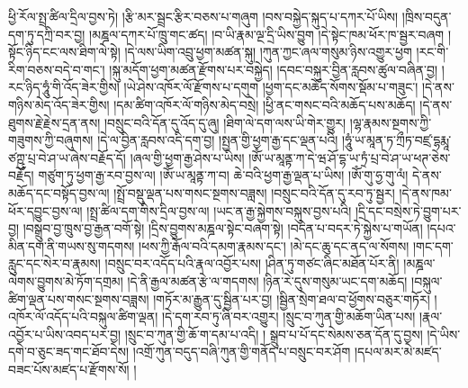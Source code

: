 ཕྱི་རོལ་སྤྲ་ཚིལ་དྲིལ་བྱས་ཏེ། །རྩི་མར་སྦྲང་རྩིར་བཅས་པ་གཞུག །བས་བསྐྱེད་སྐུད་པ་དཀར་པོ་ཡིས། །ཁྲིས་བདུན་དག་ཏུ་དཀྲི་བར་བྱ། །མཎྜལ་དཀར་པོ་ཁྲུ་གང་ཚད། །བ་ཡི་རྣམ་ལྔ་དྲི་ཡིས་བྱུག །དེ་སྟེང་ཁམ་ཕོར་ཁ་སྦྱར་བཞག །སྟོང་ཉིད་ངང་ལས་ཐིག་ལེ་སྟེ། །དེ་ལས་ཡིག་འབྲུ་ཕྱག་མཚན་སྐུ། །ཀུན་ཀྱང་ཞལ་གསུམ་ཉིས་འགྱུར་ཕྱག །རང་གི་རིག་བཅས་བདེ་བ་གང་། །སྐུ་མདོག་ཕྱག་མཚན་རྫོགས་པར་བསྐྱེད། །དབང་བསྐུར་བྱིན་རླབས་ཚུལ་བཞིན་བྱ། །རང་ཉིད་ཧཱུཾ་གི་འོད་ཟེར་གྱིས། །ཡེ་ཤེས་འཁོར་ལོ་རྫོགས་པ་དགུག །ཕྱག་དང་མཆོད་སོགས་སྡོམ་པ་གཟུང་། །དེ་ནས་གཉིས་མེད་འོད་ཟེར་གྱིས། །དམ་ཚིག་འཁོར་ལོ་གཉིས་མེད་བསྲེ། །ཕྱི་ནང་གསང་བའི་མཆོད་པས་མཆོད། །དེ་ནས་ཐུགས་རྗེ་རྗེས་དྲན་ནས། །བསྲུང་བའི་དོན་དུ་འོད་དུ་ཞུ། །ཐིག་ལེ་དག་ལས་ཡི་གེར་གྱུར། །ལྷ་རྣམས་སྔགས་ཀྱི་གཟུགས་ཀྱི་བཞུགས། །དེ་ལ་བྱིན་རླབས་འདི་དག་བྱ། །སྤྱན་གྱི་ཕྱག་རྒྱ་དང་ལྡན་པའི། །ཧཱུཾ་ཡ་མཱན་ཏ་ཀྲྀཏ་བཛྲ་དྷརྨཱ་ཙཀྵུ་པྲ་བེ་ཤ་ཡ་ཞེས་བརྗོད་དོ། །ཞལ་གྱི་ཕྱག་རྒྱ་ཤེས་པ་ཡིས། །ཨོཾ་ཡ་མཱནྟ་ཀ་དེ་ཝ་ཤོ་དྷ་ཡ་ཏྲཾ་པྲ་བེ་ཤ་ཡ་ཕཊ་ཅེས་བརྗོད། གཙུག་ཏུ་ཕྱག་རྒྱ་རབ་བྱས་ལ། །ཨོཾ་ཡ་མཱནྟ་ཀ་བ། ཆེ་བའི་ཕྱག་རྒྱ་ལྡན་པ་ཡིས། །ཨོཾ་གུ་ཧྱ་གུ་ལཾ། དེ་ནས་མཆོད་དང་བསྟོད་བྱས་ལ། །སྤྲོ་བསྡུ་ལྡན་པས་གསང་སྔགས་བཟླས། །བསྲུང་བའི་དོན་དུ་རབ་ཏུ་སྦྱར། །དེ་ནས་ཁམ་ཕོར་དབྱུང་བྱས་ལ། །སྤྲ་ཚིལ་དག་གིས་དྲིལ་བྱས་ལ། །ཡང་ན་རྒྱ་སྐྱེགས་བསྐུས་བྱས་པའི། །དྲི་དང་བསྲེས་ཏེ་བྱུག་པར་བྱ། །བསྒྲུབ་བྱ་ཁྲུས་བྱ་རྒྱན་བགོ་སྟེ། །དྲིས་བྱུགས་མཎྜལ་སྟེང་བཞག་སྟེ། །བདེན་པ་བདར་ཏེ་སྐྱེས་པ་གཡོན། །དཔའ་མིན་དག་ནི་གཡས་སུ་གདགས། །ཕས་ཀྱི་རྒོལ་བའི་དམག་རྣམས་དང་། །མེ་དང་ཆུ་དང་ནད་ལ་སོགས། །གང་དག་རླུང་དང་སེར་བ་རྣམས། །བསྲུང་བར་འདོད་པའི་རྣལ་འབྱོར་པས། །ཤིན་ཏུ་གཙང་ཞིང་མཐོན་པོར་ནི། །མཎྜལ་ལེགས་བྱུགས་མེ་ཏོག་དགྲམ། །དེ་ནི་རྒྱལ་མཚན་རྩེ་ལ་གདགས། །ཉིན་རེ་དུས་གསུམ་ཡང་དག་མཆོད། །བསྐུལ་ཚིག་ལྡན་པས་གསང་སྔགས་བཟླས། །གཏོར་མ་རྒྱུན་དུ་སྦྱིན་པར་བྱ། །སྦྱིན་སྲེག་ཐལ་བ་ཕྱོགས་བཅུར་གཏོར། །འཁོར་ལོ་འདོད་པའི་བསྐུལ་ཚིག་ལྡན། །དེ་དག་རབ་ཏུ་ཞི་བར་འགྱུར། །སྲུང་བ་ཀུན་གྱི་མཆོག་ཡིན་པས། །རྣལ་འབྱོར་པ་ཡིས་འབད་པར་བྱ། །སྲུང་བ་ཀུན་གྱི་ཆོ་ག་དམ་པ་འདི། །
སྒྲུབ་པ་པོ་དང་སེམས་ཅན་དོན་དུ་བྱས། །དེ་ཡིས་དགེ་བ་ཅུང་ཟད་གང་ཐོབ་དེས། །འགྲོ་ཀུན་བདུད་བཞི་ཀུན་གྱི་གནོད་པ་བསྲུང་བར་ཤོག །དཔལ་མར་མེ་མཛད་བཟང་པོས་མཛད་པ་རྫོགས་སོ། །